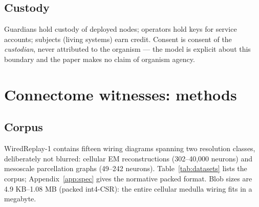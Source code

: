 \documentclass[pdflatex,sn-basic]{sn-jnl}
\begin{document}
\subsection{Custody}
Guardians hold custody of deployed nodes; operators hold keys for
service accounts; subjects (living systems) earn credit. Consent is
consent of the \emph{custodian}, never attributed to the organism ---
the model is explicit about this boundary and the paper makes no
claim of organism agency.

\section{Connectome witnesses: methods}\label{sec:methods}
\subsection{Corpus}\label{sec:corpus}
WiredReplay-1 contains fifteen wiring diagrams spanning two
resolution classes, deliberately not blurred: cellular EM
reconstructions (302--40{,}000 neurons) and mesoscale parcellation
graphs (49--242 neurons). Table~\ref{tab:datasets} lists the corpus;
Appendix~\ref{app:spec} gives the normative packed format.
Blob sizes are 4.9 KB--1.08 MB (packed int4-CSR): the entire cellular
medulla wiring fits in a megabyte.
\end{document}
